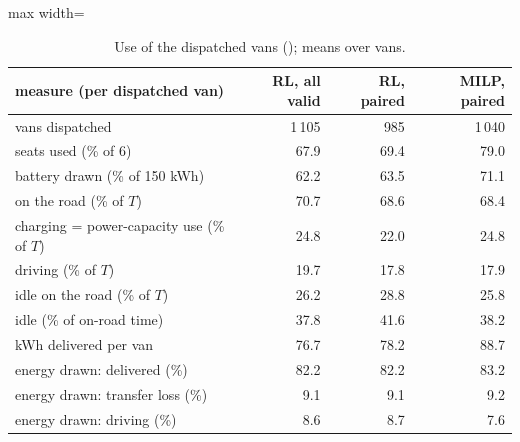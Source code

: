 \begin{table}[H]\centering
\caption{Use of the dispatched vans (); means over vans.}\label{tab:utilvans}
\begin{adjustbox}{max width=\textwidth}\begin{tabular}{lrrr}\toprule
measure (per dispatched van) & RL, all valid & RL, paired & MILP, paired \\ \midrule
vans dispatched & 1\,105 & 985 & 1\,040 \\
seats used (\% of 6) & 67.9 & 69.4 & 79.0 \\
battery drawn (\% of 150 kWh) & 62.2 & 63.5 & 71.1 \\
on the road (\% of $T$) & 70.7 & 68.6 & 68.4 \\
charging = power-capacity use (\% of $T$) & 24.8 & 22.0 & 24.8 \\
driving (\% of $T$) & 19.7 & 17.8 & 17.9 \\
idle on the road (\% of $T$) & 26.2 & 28.8 & 25.8 \\
idle (\% of on-road time) & 37.8 & 41.6 & 38.2 \\
kWh delivered per van & 76.7 & 78.2 & 88.7 \\
energy drawn: delivered (\%) & 82.2 & 82.2 & 83.2 \\
energy drawn: transfer loss (\%) & 9.1 & 9.1 & 9.2 \\
energy drawn: driving (\%) & 8.6 & 8.7 & 7.6 \\
\bottomrule\end{tabular}\end{adjustbox}\end{table}
